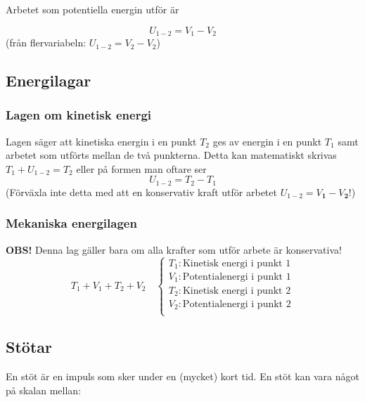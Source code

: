 \documentclass{article}
\newenvironment{ankiflashcard}[1]{}{}
\begin{document}
\begin{paracol}{2}
\begin{ankiflashcard}{Definiera potentiell energi}
Arbetet som potentiella energin utför är

$$
U_{1-2} = V_1 - V_2
$$
(från flervariabeln: $U_{1-2}=V_2-V_2$)
\end{ankiflashcard}
\subsection{Energilagar}

\begin{ankiflashcard}{Formulera lagen om kinetisk energi}
\subsubsection{Lagen om kinetisk energi}
Lagen säger att kinetiska energin i en punkt $T_2$ ges av energin i en punkt $T_1$ samt arbetet som utförts mellan de två punkterna. Detta kan matematiskt skrivas $T_1 + U_{1-2} = T_2$ eller på formen man oftare ser
$$
U_{1-2} = T_2 - T_1
$$
(Förväxla inte detta med att en konservativ kraft utför arbetet $U_{1-2}=V_{\mathbf 1}-V_{\mathbf 2}$!)
\end{ankiflashcard}

\begin{ankiflashcard}{Formulera mekaniska energilagen}
    
\subsubsection{Mekaniska energilagen}
\textbf{OBS!} Denna lag gäller bara om alla krafter som utför arbete är konservativa!
$$
T_1 + V_1 + T_2 + V_2\quad\left\{\begin{array}{l}T_1: \text{Kinetisk energi i punkt 1} \\V_1: \text{Potentialenergi i punkt 1} \\T_2: \text{Kinetisk energi i punkt 2} \\V_2: \text{Potentialenergi i punkt 2} \\\end{array}\right.$$
\end{ankiflashcard}

\subsection{Stötar}
En stöt är en impuls som sker under en (mycket) kort tid. En stöt kan vara något på skalan mellan:


\end{paracol}
\end{document}
